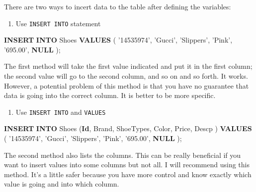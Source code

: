 \documentclass[]{book}
\makeatletter
\newenvironment{Shaded}{\begin{snugshade}}{\end{snugshade}}
\newcommand{\KeywordTok}[1]{\textcolor[rgb]{0.13,0.29,0.53}{\textbf{{#1}}}}
\newcommand{\StringTok}[1]{\textcolor[rgb]{0.31,0.60,0.02}{{#1}}}
\newcommand{\NormalTok}[1]{{#1}}
\providecommand{\tightlist}{%
  \setlength{\itemsep}{0pt}\setlength{\parskip}{0pt}}
\newenvironment{kframe}{%
\medskip{}
\setlength{\fboxsep}{.8em}
 \def\at@end@of@kframe{}%
 \ifinner\ifhmode%
  \def\at@end@of@kframe{\end{minipage}}%
  \begin{minipage}{\columnwidth}%
 \fi\fi%
 \def\FrameCommand##1{\hskip\@totalleftmargin \hskip-\fboxsep
 \colorbox{shadecolor}{##1}\hskip-\fboxsep
     \hskip-\linewidth \hskip-\@totalleftmargin \hskip\columnwidth}%
 \MakeFramed {\advance\hsize-\width
   \@totalleftmargin\z@ \linewidth\hsize
   \@setminipage}}%
 {\par\unskip\endMakeFramed%
 \at@end@of@kframe}
\renewenvironment{Shaded}{\begin{kframe}}{\end{kframe}}
\theoremstyle{definition}
\theoremstyle{definition}
\theoremstyle{remark}
\makeatother
\begin{document}
There are two ways to incert data to the table after defining the
variables:

\begin{enumerate}
\def\labelenumi{(\arabic{enumi})}
\tightlist
\item
  Use \texttt{INSERT\ INTO} statement
\end{enumerate}

\begin{Shaded}
\begin{Highlighting}[]
\KeywordTok{INSERT} \KeywordTok{INTO} \NormalTok{Shoes}
\KeywordTok{VALUES} \NormalTok{( }\StringTok{'14535974'}\NormalTok{,}
\StringTok{'Gucci'}\NormalTok{,}
\StringTok{'Slippers'}\NormalTok{,}
\StringTok{'Pink'}\NormalTok{,}
\StringTok{'695.00'}\NormalTok{,}
\KeywordTok{NULL}
\NormalTok{);}
\end{Highlighting}
\end{Shaded}

The first method will take the first value indicated and put it in the
first column; the second value will go to the second column, and so on
and so forth. It works. However, a potential problem of this method is
that you have no guarantee that data is going into the correct column.
It is better to be more specific.

\begin{enumerate}
\def\labelenumi{(\arabic{enumi})}
\setcounter{enumi}{1}
\tightlist
\item
  Use \texttt{INSERT\ INTO} and \texttt{VALUES}
\end{enumerate}

\begin{Shaded}
\begin{Highlighting}[]
\KeywordTok{INSERT} \KeywordTok{INTO} \NormalTok{Shoes}
\NormalTok{(}\KeywordTok{Id}\NormalTok{, }
\NormalTok{Brand,}
\NormalTok{ShoeTypes,}
\NormalTok{Color,}
\NormalTok{Price,}
\NormalTok{Descp}
\NormalTok{)}
\KeywordTok{VALUES} 
\NormalTok{( }
\StringTok{'14535974'}\NormalTok{,}
\StringTok{'Gucci'}\NormalTok{,}
\StringTok{'Slippers'}\NormalTok{,}
\StringTok{'Pink'}\NormalTok{,}
\StringTok{'695.00'}\NormalTok{,}
\KeywordTok{NULL}
\NormalTok{);}
\end{Highlighting}
\end{Shaded}

The second method also lists the columns. This can be really beneficial
if you want to insert values into some columns but not all. I will
recommend using this method. It's a little safer because you have more
control and know exactly which value is going and into which column.
\end{document}
